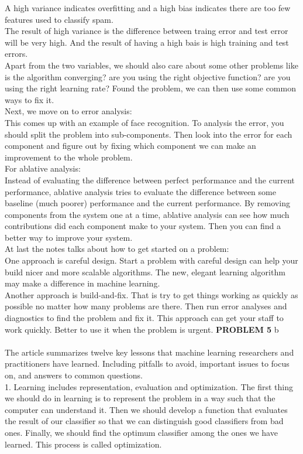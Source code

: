 \documentclass[11pt,a4paper,fleqn]{article}
\begin{document}
A high variance indicates overfitting and a high bias indicates there are too few features used to classify spam.\\
The result of high variance is the difference between traing error and test error will be very high. And the result of having a high bais is high training and test errors.\\
Apart from the two variables, we should also care about some other problems like is the algorithm converging? are you using the right objective function? are you using the right learning rate?  Found the problem, we can then use some common ways to fix it.\\
Next, we move on to error analysis:\\
This comes up with an example of face recognition. To analysis the error, you should split the problem into sub-components. Then look into the error for each component and figure out by fixing which component we can make an improvement to the whole problem.\\
For ablative analysis:\\
Instead of evaluating the difference between perfect performance and the current performance, ablative analysis tries to evaluate the difference between some baseline (much poorer) performance and the current performance. By removing components from the system one at a time, ablative analysis can see how much contributions did each component make to your system. Then you can find a better way to improve your system.\\
At last the notes talks about how to get started  on a problem:\\
One approach is careful design. Start a problem with careful design can help your build nicer and more scalable algorithms. The new, elegant learning algorithm may make a difference in machine learning.\\
Another approach is build-and-fix. That is try to get things working as quickly as possible no matter how many problems are there. Then run error analyses and diagnostics to find the problem and fix it. This approach can get your staff to work quickly. Better to use it when the problem is urgent.
\newpage \noindent
\textbf{PROBLEM 5} b\\ \\
The article summarizes twelve key lessons that machine learning researchers and practitioners have learned. Including pitfalls to avoid, important issues to focus on, and answers to common questions.\\
1. Learning includes representation, evaluation and optimization. The first thing we should do in learning is to represent the problem in a way such that the computer can understand it. Then we should develop a function that evaluates the result of our classifier so that we can distinguish  good classifiers from bad ones. Finally, we should find the optimum classifier among the ones we have learned. This process is called optimization.\\
\end{document}
